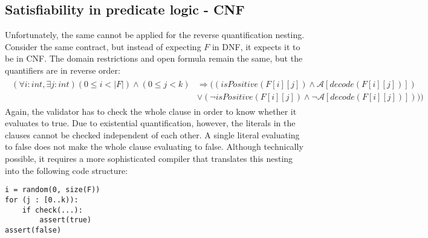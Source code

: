 \subsection{Satisfiability in predicate logic - CNF}
Unfortunately, the same cannot be applied for the reverse quantification nesting. Consider the same contract, but instead of expecting $F$ in DNF, it expects it to be in CNF. The domain restrictions and open formula remain the same, but the quantifiers are in reverse order:
\begin{gather*}\label{eq:cnf_sat}
\begin{aligned}
(\forall i : int, \exists j : int) (0 \leq i < |F|) \wedge (0 \leq j < k) &\Rightarrow ((isPositive(F[i][j]) \wedge \mathcal{A}[decode(F[i][j])]) \\
&\vee (\neg isPositive(F[i][j]) \wedge \neg \mathcal{A}[decode(F[i][j])])))
\end{aligned}
\end{gather*}
Again, the validator has to check the whole clause in order to know whether it evaluates to true. Due to existential quantification, however, the literals in the clauses cannot be checked independent of each other. A single literal evaluating to false does not make the whole clause evaluating to false. Although technically possible, it requires a more sophisticated compiler that translates this nesting into the following code structure:
\begin{lstlisting}[label=lst:rand_loop_dependent, numbers=none]
i = random(0, size(F))
for (j : [0..k)):
	if check(...):
		assert(true)
assert(false)
\end{lstlisting}

